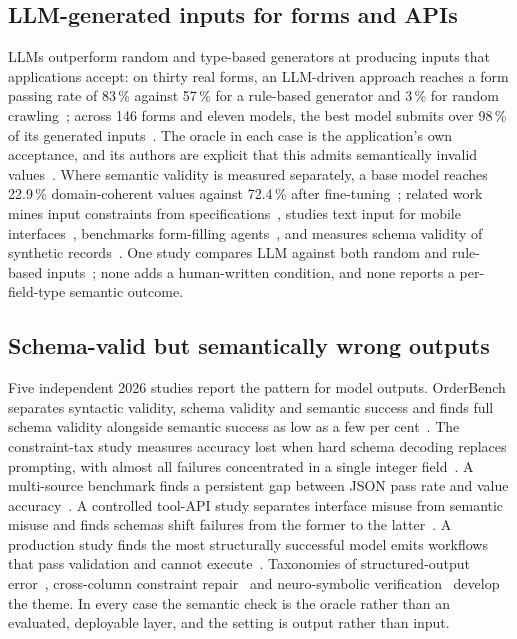\documentclass[conference]{IEEEtran}
\begin{document}
\subsection{LLM-generated inputs for forms and APIs}
LLMs outperform random and type-based generators at producing inputs that applications accept: on
thirty real forms, an LLM-driven approach reaches a form passing rate of 83\,\% against 57\,\% for a
rule-based generator and 3\,\% for random crawling~\cite{alian2024formnexus}; across 146 forms and
eleven models, the best model submits over 98\,\% of its generated
inputs~\cite{li2026webformtest}. The oracle in each case is the application's own acceptance, and its
authors are explicit that this admits semantically invalid
values~\cite{li2026webformtest,tigulla2026robustness}. Where semantic validity is measured
separately, a base model reaches 22.9\,\% domain-coherent values against 72.4\,\% after
fine-tuning~\cite{kim2025llamaresttest}; related work mines input constraints from
specifications~\cite{kim2024restgpt,huynh2024constraints}, studies text input for mobile
interfaces~\cite{cui2024guitextinput}, benchmarks form-filling
agents~\cite{li2025formfactory}, and measures schema validity of synthetic
records~\cite{mishra2026structuredsynthetic}. One study compares LLM against both random and
rule-based inputs~\cite{alian2024formnexus}; none adds a human-written condition, and none reports a
per-field-type semantic outcome.

\subsection{Schema-valid but semantically wrong outputs}
Five independent 2026 studies report the pattern for model outputs. OrderBench separates syntactic
validity, schema validity and semantic success and finds full schema validity alongside semantic
success as low as a few per cent~\cite{li2026orderbench}. The constraint-tax study measures accuracy
lost when hard schema decoding replaces prompting, with almost all failures concentrated in a single
integer field~\cite{ray2026constrainttax}. A multi-source benchmark finds a persistent gap between
JSON pass rate and value accuracy~\cite{singh2026sob}. A controlled tool-API study separates
interface misuse from semantic misuse and finds schemas shift failures from the former to the
latter~\cite{sigdel2026schemafirst}. A production study finds the most structurally successful model
emits workflows that pass validation and cannot execute~\cite{wrenn2026enterprise}. Taxonomies of
structured-output error~\cite{song2026structuredoutput}, cross-column constraint
repair~\cite{zhao2026constraintaware} and neuro-symbolic verification~\cite{sigloch2026neurosymbolic}
develop the theme. In every case the semantic check is the oracle rather than an evaluated,
deployable layer, and the setting is output rather than input.
\end{document}
